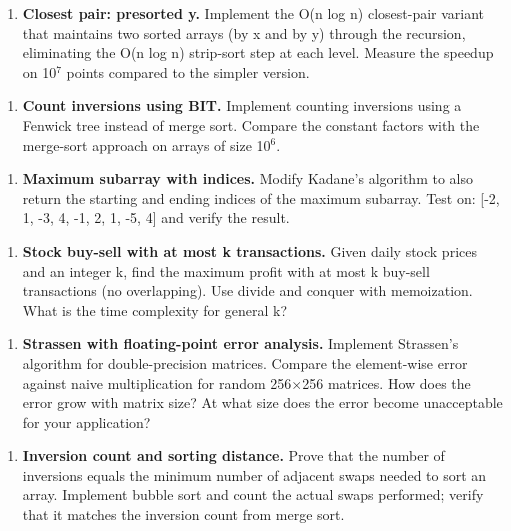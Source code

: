 \begin{enumerate}
\item \textbf{Closest pair: presorted y.} Implement the O(n log n) closest-pair variant that maintains two sorted arrays (by x and by y) through the recursion, eliminating the O(n log n) strip-sort step at each level. Measure the speedup on 10$^{7}$ points compared to the simpler version.
\end{enumerate}

\begin{enumerate}
\item \textbf{Count inversions using BIT.} Implement counting inversions using a Fenwick tree instead of merge sort. Compare the constant factors with the merge-sort approach on arrays of size 10$^{6}$.
\end{enumerate}

\begin{enumerate}
\item \textbf{Maximum subarray with indices.} Modify Kadane's algorithm to also return the starting and ending indices of the maximum subarray. Test on: [-2, 1, -3, 4, -1, 2, 1, -5, 4] and verify the result.
\end{enumerate}

\begin{enumerate}
\item \textbf{Stock buy-sell with at most k transactions.} Given daily stock prices and an integer k, find the maximum profit with at most k buy-sell transactions (no overlapping). Use divide and conquer with memoization. What is the time complexity for general k?
\end{enumerate}

\begin{enumerate}
\item \textbf{Strassen with floating-point error analysis.} Implement Strassen's algorithm for double-precision matrices. Compare the element-wise error against naive multiplication for random 256$\times$256 matrices. How does the error grow with matrix size? At what size does the error become unacceptable for your application?
\end{enumerate}

\begin{enumerate}
\item \textbf{Inversion count and sorting distance.} Prove that the number of inversions equals the minimum number of adjacent swaps needed to sort an array. Implement bubble sort and count the actual swaps performed; verify that it matches the inversion count from merge sort.
\end{enumerate}

